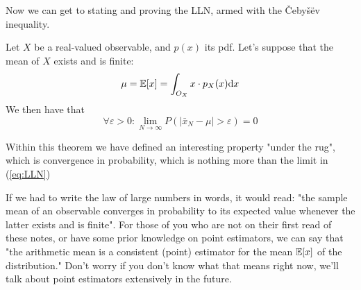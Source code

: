 Now we can get to stating and proving the LLN, armed with the Čebyšëv inequality. 

\begin{theorem}
	Let $X$ be a real-valued observable, and $p(x)$ its pdf. Let's suppose that the mean of $X$ exists and is finite:
	\begin{equation}
	\mu = \mathbb{E}[x]=\int_{O_X} x\cdot p_X(x)\mathrm{d} x
	\label{eq:LLN_mean}
	\end{equation}
	We then have that 
	\begin{equation}
	\forall \varepsilon > 0: \lim_{N\to\infty} P\left( \left| \bar{x}_N - \mu\right| > \varepsilon\right) =0
	\label{eq:LLN}
	\end{equation}
\end{theorem}


Within this theorem we have defined an interesting property "under the rug", which is convergence in probability, which is nothing more than the limit in (\ref{eq:LLN})

If we had to write the law of large numbers in words, it would read: "the sample mean of an observable converges in probability to its expected value whenever the latter exists and is finite". For those of you who are not on their first read of these notes, or have some prior knowledge on point estimators, we can say that "the arithmetic mean is a consistent (point) estimator for the mean $\mathbb{E}[x]$ of the distribution." Don't worry if you don't know what that means right now, we'll talk about point estimators extensively in the future.

